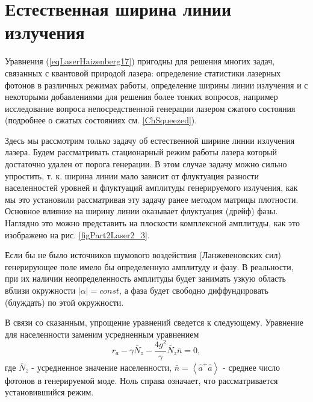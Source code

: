 \section{Естественная ширина линии излучения}
Уравнения (\ref{eqLaserHaizenberg17}) пригодны для решения многих
задач, связанных с квантовой природой лазера: определение статистики
лазерных фотонов в различных режимах работы, определение ширины
линии излучения и с некоторыми добавлениями для решения более тонких
вопросов, например исследование вопроса непосредственной генерации
лазером сжатого состояния (подробнее о сжатых состояниях
см. \ref{ChSqueezed}). 



Здесь мы рассмотрим только задачу об естественной ширине линии
излучения лазера. Будем рассматривать стационарный режим работы лазера
который достаточно удален от порога генерации. В этом случае задачу
можно сильно упростить, т. к. ширина линии мало зависит от флуктуация
разности населенностей уровней и флуктуаций амплитуды генерируемого
излучения, как мы это установили рассматривая эту задачу ранее методом
матрицы плотности. Основное влияние на ширину линии оказывает
флуктуация (дрейф) фазы. Наглядно это можно представить на плоскости
комплексной амплитуды, как это изображено на
рис. \ref{figPart2Laser2_3}.

Если бы не было источников шумового воздействия (Ланжевеновских сил)
генерирующее поле имело бы определенную амплитуду и фазу. В
реальности, при их наличии неопределенность амплитуды будет занимать
узкую область вблизи окружности $\left|\alpha\right| = const$, а фаза
будет свободно диффундировать (блуждать) по этой окружности. 

В связи со сказанным, упрощение уравнений сведется к
следующему. Уравнение для населенности заменим усредненным уравнением 
\begin{equation}
r_a - \gamma \bar{N}_z - \frac{4 g^2}{\gamma}\bar{N}_z\bar{n} = 0,
\label{eqLaserHaizenberg19}
\end{equation}
где $\bar{N}_z$ - усредненное значение населенности, $\bar{n} =
\left<\hat{a}^{+}\hat{a}\right>$ - среднее число фотонов в
генерируемой моде. Ноль справа означает, что рассматривается
установившийся режим. 

